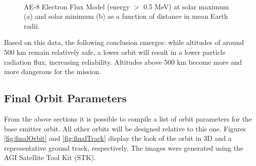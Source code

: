 \begin{figure}
  \centering
  \\                
  \caption{AE-8 Electron Flux Model (energy $>$ 0.5 MeV) at solar maximum (a) and solar minimum (b) as a function of distance in mean Earth radii.}
  \label{fig:elecFlux}
\end{figure}

Based on this data, the following conclusion emerges: while altitudes of around 500 km remain relatively safe, a lower orbit will result in a lower particle radiation flux, increasing reliability. Altitudes above 500 km become more and more dangerous for the mission.

\subsection{Final Orbit Parameters}
\label{mtrAltConclusion}

From the above sections it is possible to compile a list of orbit parameters for the base emitter orbit. All other orbits will be designed relative to this one. Figures \ref{fig:finalOrbit} and \ref{fig:finalTrack} display the look of the orbit in 3D and a representative ground track, respectively. The images were generated using the AGI Satellite Tool Kit (STK).

